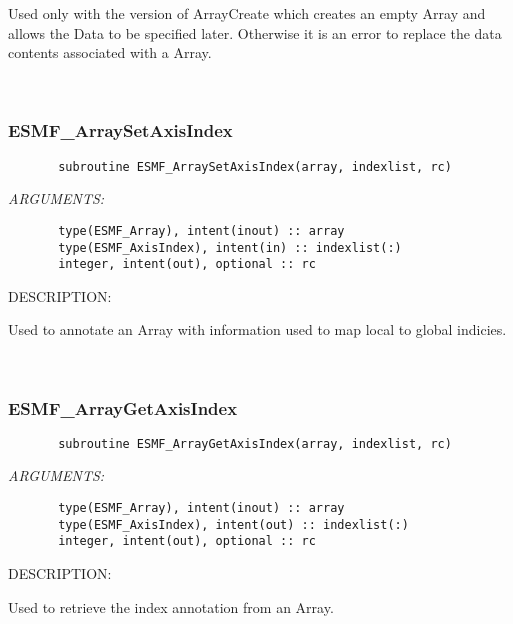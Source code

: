    Used only with the version of ArrayCreate which creates an empty
   Array and allows the Data to be specified later. Otherwise it is an
   error to replace the data contents associated with a Array.
   
 
\mbox{}\hrulefill\ 
 
\subsubsection [ESMF\_ArraySetAxisIndex] {ESMF\_ArraySetAxisIndex}


  
\begin{verbatim}       subroutine ESMF_ArraySetAxisIndex(array, indexlist, rc)\end{verbatim}{\em ARGUMENTS:}
\begin{verbatim}       type(ESMF_Array), intent(inout) :: array
       type(ESMF_AxisIndex), intent(in) :: indexlist(:)
       integer, intent(out), optional :: rc\end{verbatim}
{\sf DESCRIPTION:\\ }


   Used to annotate an Array with information used to map local to global
   indicies.
   
 
\mbox{}\hrulefill\ 
 
\subsubsection [ESMF\_ArrayGetAxisIndex] {ESMF\_ArrayGetAxisIndex}


  
\begin{verbatim}       subroutine ESMF_ArrayGetAxisIndex(array, indexlist, rc)\end{verbatim}{\em ARGUMENTS:}
\begin{verbatim}       type(ESMF_Array), intent(inout) :: array
       type(ESMF_AxisIndex), intent(out) :: indexlist(:)
       integer, intent(out), optional :: rc\end{verbatim}
{\sf DESCRIPTION:\\ }


   Used to retrieve the index annotation from an Array.
   
 
